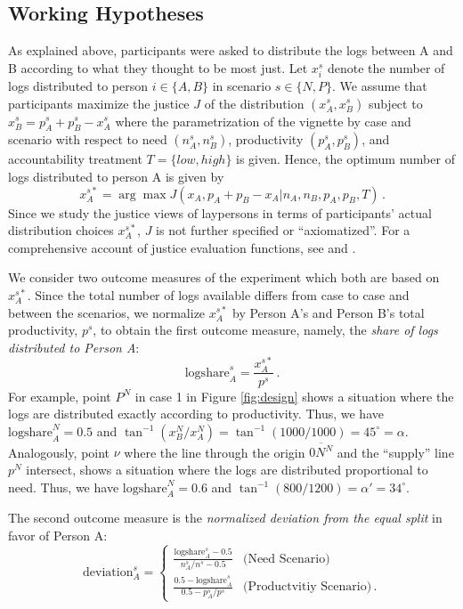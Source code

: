 \documentclass[smallcondensed]{svjour3}
\begin{document}
\subsection{Working Hypotheses}\label{sec:hypotheses}
%
As explained above, participants were asked to distribute the logs between A and B according to what they thought to be most just. Let $x_i^s$ denote the number of logs distributed to person $i\in\{A,B\}$ in scenario $s\in\{N,P\}$. We assume that participants maximize the justice $J$ of the distribution $(x_A^s,x_B^s)$ subject to $x_B^s=p_A^s+p_B^s-x_A^s$ where the parametrization of the vignette by case and scenario with respect to need $(n_A^s,n_B^s)$, productivity $(p_A^s,p_B^s)$, and accountability treatment $T=\{low,high\}$ is given. Hence, the optimum number of logs distributed to person A is given by
%
\begin{equation}
x_A^{s\ast}=\arg\max J(x_A,p_A+p_B-x_A|n_A,n_B,p_A,p_B,T)\,.
\end{equation}
%
Since we study the justice views of laypersons in terms of participants' actual distribution choices $x_A^{s\ast}$, $J$ is not further specified or ``axiomatized''. For a comprehensive account of justice evaluation functions, see \citet{jasso_justice_1978} and \citet{jasso_distributive_2016}.\par
%
We consider two outcome measures of the experiment which both are based on $x_A^{s\ast}$. Since the total number of logs available differs from case to case and between the scenarios, we normalize $x_A^{s\ast}$ by Person A's and Person B's total productivity, $p^s$, to obtain the first outcome measure, namely, the \textit{share of logs distributed to Person A}:
%
\begin{equation}
\mbox{logshare}_A^s=\frac{x_A^{s\ast}}{p^s}\,.
\end{equation}
%
For example, point $P^N$ in case 1 in Figure \ref{fig:design} shows a situation where the logs are distributed exactly according to productivity. Thus, we have $\mbox{logshare}_A^N=0.5$ and $\tan^{-1}(x^N_B/x^N_A)=\tan^{-1}(1000/1000)=45^\circ=\alpha$. Analogously, point $\nu$ where the line through the origin $\overline{0N^N}$ and the ``supply'' line $p^N$ intersect, shows a situation where the logs are distributed proportional to need. Thus, we have $\mbox{logshare}_A^N=0.6$ and $\tan^{-1}(800/1200)=\alpha'=34^\circ$.\par
%
The second outcome measure is the \textit{normalized deviation from the equal split} in favor of Person A:
%
\begin{equation}
\mbox{deviation}_A^s=\left\{\begin{array}{ll} \frac{\mbox{logshare}_A^s-0.5}{n_A^s/n^s-0.5} & \mbox{(Need Scenario)} \\
\frac{0.5-\mbox{logshare}_A^s}{0.5-p_A^s/p^s} & \mbox{(Productvitiy Scenario)}\,.
\end{array}
\right.
\end{equation}
\end{document}
